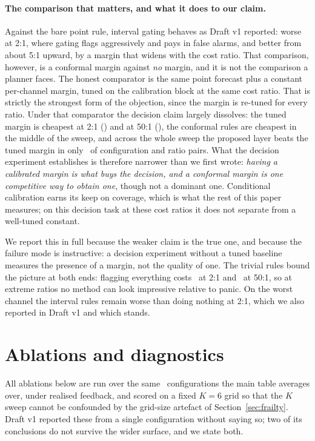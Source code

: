 \documentclass[11pt]{article}
\begin{document}
\paragraph{The comparison that matters, and what it does to our claim.} Against the bare point rule, interval gating behaves as Draft v1 reported: worse at 2:1, where gating flags aggressively and pays in false alarms, and better from about 5:1 upward, by a margin that widens with the cost ratio. That comparison, however, is a conformal margin against \emph{no} margin, and it is not the comparison a planner faces. The honest comparator is the same point forecast plus a constant per-channel margin, tuned on the calibration block at the same cost ratio. That is strictly the strongest form of the objection, since the margin is re-tuned for every ratio. Under that comparator the decision claim largely dissolves: the tuned margin is cheapest at 2:1 (\dmMarginTwo) and at 50:1 (\dmMarginFifty), the conformal rules are cheapest in the middle of the sweep, and across the whole sweep the proposed layer beats the tuned margin in only \dmPropBeatsMargin\ of configuration and ratio pairs. What the decision experiment establishes is therefore narrower than we first wrote: \emph{having a calibrated margin is what buys the decision, and a conformal margin is one competitive way to obtain one}, though not a dominant one. Conditional calibration earns its keep on coverage, which is what the rest of this paper measures; on this decision task at these cost ratios it does not separate from a well-tuned constant.

We report this in full because the weaker claim is the true one, and because the failure mode is instructive: a decision experiment without a tuned baseline measures the presence of a margin, not the quality of one. The trivial rules bound the picture at both ends: flagging everything costs \dmFlagAllTwo\ at 2:1 and \dmFlagAllFifty\ at 50:1, so at extreme ratios no method can look impressive relative to panic. On the worst channel the interval rules remain worse than doing nothing at 2:1, which we also reported in Draft v1 and which stands.

\section{Ablations and diagnostics}\label{sec:ablations}

All ablations below are run over the same \ablNumConfigs\ configurations the main table averages over, under realised feedback, and scored on a fixed $K = 6$ grid so that the $K$ sweep cannot be confounded by the grid-size artefact of Section~\ref{sec:frailty}. Draft v1 reported these from a single configuration without saying so; two of its conclusions do not survive the wider surface, and we state both.
\end{document}
